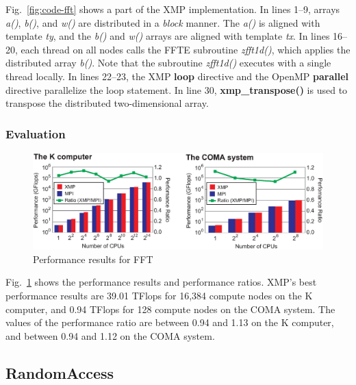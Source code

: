 \documentclass[graybox]{svmult}
\begin{document}
Fig.~\ref{fig:code-fft} shows a part of the XMP implementation.
In lines 1--9, arrays {\it a()}, {\it b()}, and {\it w()} are distributed in a {\it block} manner.
The {\it a()} is aligned with template {\it ty}, and the {\it b()} and {\it w()} arrays are aligned with template {\it tx}.
In lines 16--20, each thread on all nodes calls the FFTE subroutine {\it zfft1d()}, which applies the distributed array {\it b()}.
Note that the subroutine {\it zfft1d()} executes with a single thread locally.
In lines 22--23,
the XMP {\bf loop} directive and the OpenMP {\bf parallel} directive parallelize the loop statement.
In line 30, {\bf xmp\_transpose()} is used to transpose the distributed two-dimensional array.
\subsubsection{Evaluation}
\begin{figure}[h]
\sidecaption
\includegraphics[scale=0.4,clip]{img/result-fft.eps}
\caption{Performance results for FFT\cite{hpca}}\label{fig:result-fft}
\end{figure}

Fig.~\ref{fig:result-fft} shows the performance results and performance ratios.
XMP's best performance results are 39.01 TFlops for 16,384 compute nodes on the K computer,
and 0.94 TFlops for 128 compute nodes on the COMA system.
The values of the performance ratio are between 0.94 and 1.13 on the K computer,
and between 0.94 and 1.12 on the COMA system.

\subsection{RandomAccess}
\end{document}
